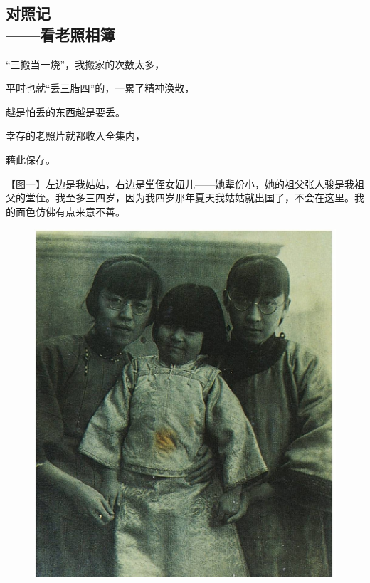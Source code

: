 \subsection{对照记\\\small{——看老照相簿}}


\par “三搬当一烧”，我搬家的次数太多，
\par 平时也就“丢三腊四”的，一累了精神涣散，
\par 越是怕丢的东西越是要丢。
\par 幸存的老照片就都收入全集内，
\par 藉此保存。
\par {}



\par 【图一】左边是我姑姑，右边是堂侄女妞儿——她辈份小，她的祖父张人骏是我祖父的堂侄。我至多三四岁，因为我四岁那年夏天我姑姑就出国了，不会在这里。我的面色仿佛有点来意不善。
\begin{figure}[htb]
    \centering %
    \includegraphics[scale=0.4]{picture/对照记1.jpeg}
\end{figure}

